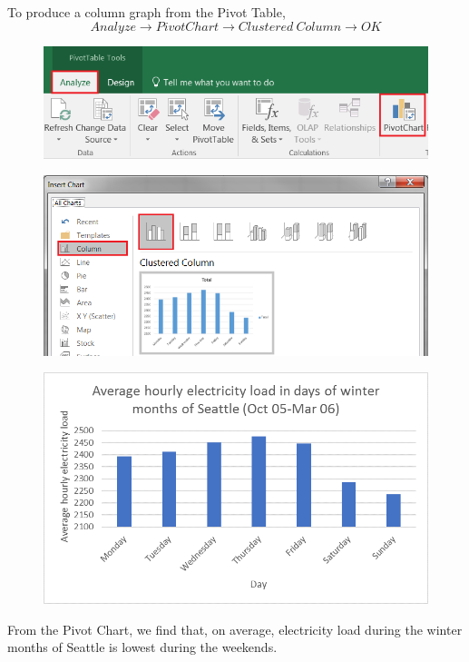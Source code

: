 \documentclass[12pt]{report}
\begin{document}
\newpage
\noindent To produce a column graph from the Pivot Table,
$$Analyze \to PivotChart \to Clustered\ Column \to OK$$
\begin{figure}[H]
	\centerline{\includegraphics{q1_12}}
\end{figure}
\vspace{-\baselineskip}
\begin{figure}[H]
	\centerline{\includegraphics{q1_13}}
\end{figure}
\vspace{-\baselineskip}
\begin{figure}[H]
	\centerline{\includegraphics{q1_14}}
\end{figure}
\vspace{-\baselineskip}
\noindent From the Pivot Chart, we find that, on average, electricity load during the winter months of Seattle is lowest during the weekends.
\end{document}
